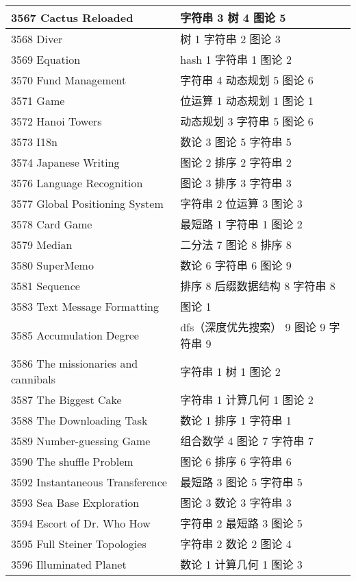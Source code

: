 \begin{longtable}{| p{} | p{} |}
 3567 Cactus Reloaded  & 字符串 3 树 4 图论 5 \\ \hline
 3568 Diver  & 树 1 字符串 2 图论 3 \\ \hline
 3569 Equation  & hash 1 字符串 1 图论 2 \\ \hline
 3570 Fund Management  & 字符串 4 动态规划 5 图论 6 \\ \hline
 3571 Game  & 位运算 1 动态规划 1 图论 1 \\ \hline
 3572 Hanoi Towers  & 动态规划 3 字符串 5 图论 6 \\ \hline
 3573 I18n  & 数论 3 图论 5 字符串 5 \\ \hline
 3574 Japanese Writing  & 图论 2 排序 2 字符串 2 \\ \hline
 3576 Language Recognition  & 图论 3 排序 3 字符串 3 \\ \hline
 3577 Global Positioning System  & 字符串 2 位运算 3 图论 3 \\ \hline
 3578 Card Game  & 最短路 1 字符串 1 图论 2 \\ \hline
 3579 Median  & 二分法 7 图论 8 排序 8 \\ \hline
 3580 SuperMemo  & 数论 6 字符串 6 图论 9 \\ \hline
 3581 Sequence  & 排序 8 后缀数据结构 8 字符串 8 \\ \hline
 3583 Text Message Formatting  & 图论 1 \\ \hline
 3585 Accumulation Degree  & dfs（深度优先搜索） 9 图论 9 字符串 9 \\ \hline
 3586 The missionaries and cannibals  & 字符串 1 树 1 图论 2 \\ \hline
 3587 The Biggest Cake  & 字符串 1 计算几何 1 图论 2 \\ \hline
 3588 The Downloading Task  & 数论 1 排序 1 字符串 1 \\ \hline
 3589 Number-guessing Game  & 组合数学 4 图论 7 字符串 7 \\ \hline
 3590 The shuffle Problem  & 图论 6 排序 6 字符串 6 \\ \hline
 3592 Instantaneous Transference  & 最短路 3 图论 5 字符串 5 \\ \hline
 3593 Sea Base Exploration  & 图论 3 数论 3 字符串 3 \\ \hline
 3594 Escort of Dr. Who How  & 字符串 2 最短路 3 图论 5 \\ \hline
 3595 Full Steiner Topologies  & 字符串 2 数论 2 图论 4 \\ \hline
 3596 Illuminated Planet  & 数论 1 计算几何 1 图论 3 \\ \hline

\end{longtable}
